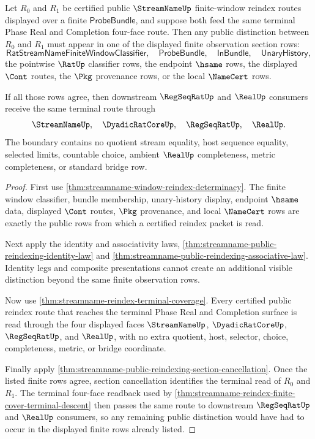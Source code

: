 \begin{theorem}
\label{thm:streamname-public-reindexing-cancellation-boundary}
Let $R_0$ and $R_1$ be certified public $\StreamNameUp$ finite-window reindex
routes displayed over a finite $\mathsf{ProbeBundle}$, and suppose both feed
the same terminal Phase Real and Completion four-face route. Then any public
distinction between $R_0$ and $R_1$ must appear in one of the displayed finite
observation section rows:
$$
\mathsf{RatStreamNameFiniteWindowClassifier},\quad
\mathsf{ProbeBundle},\quad
\mathsf{InBundle},\quad
\mathsf{UnaryHistory},
$$
the pointwise $\RatUp$ classifier rows, the endpoint $\hsame$ rows, the
displayed $\Cont$ routes, the $\Pkg$ provenance rows, or the local
$\NameCert$ rows.

If all those rows agree, then downstream $\RegSeqRatUp$ and $\RealUp$
consumers receive the same terminal route through
$$
\StreamNameUp,\quad \DyadicRatCoreUp,\quad \RegSeqRatUp,\quad \RealUp.
$$
The boundary contains no quotient stream equality, host sequence equality,
selected limits, countable choice, ambient $\RealUp$ completeness, metric
completeness, or standard bridge row.
\end{theorem}
\begin{proof}
First use \autoref{thm:streamname-window-reindex-determinacy}. The finite
window classifier, bundle membership, unary-history display, endpoint
$\hsame$ data, displayed $\Cont$ routes, $\Pkg$ provenance, and local
$\NameCert$ rows are exactly the public rows from which a certified reindex
packet is read.

Next apply the identity and associativity laws,
\autoref{thm:streamname-public-reindexing-identity-law} and
\autoref{thm:streamname-public-reindexing-associative-law}. Identity legs and
composite presentations cannot create an additional visible distinction
beyond the same finite observation rows.

Now use \autoref{thm:streamname-reindex-terminal-coverage}. Every certified
public reindex route that reaches the terminal Phase Real and Completion
surface is read through the four displayed faces
$\StreamNameUp$, $\DyadicRatCoreUp$, $\RegSeqRatUp$, and $\RealUp$, with no
extra quotient, host, selector, choice, completeness, metric, or bridge
coordinate.

Finally apply
\autoref{thm:streamname-public-reindexing-section-cancellation}. Once the
listed finite rows agree, section cancellation identifies the terminal read of
$R_0$ and $R_1$. The terminal four-face readback used by
\autoref{thm:streamname-reindex-finite-cover-terminal-descent} then passes
the same route to downstream $\RegSeqRatUp$ and $\RealUp$ consumers, so any
remaining public distinction would have had to occur in the displayed finite
rows already listed.
\end{proof}

